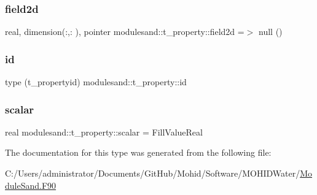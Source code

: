 \subsubsection{\texorpdfstring{field2d}{field2d}}
{\footnotesize\ttfamily real, dimension(\+:,\+:  ), pointer modulesand\+::t\+\_\+property\+::field2d =$>$ null ()\hspace{0.3cm}{\ttfamily [private]}}

\mbox{\label{structmodulesand_1_1t__property_a6497eb65f7326ef3fdb99c3c26823d44}} 
\subsubsection{\texorpdfstring{id}{id}}
{\footnotesize\ttfamily type (t\+\_\+propertyid) modulesand\+::t\+\_\+property\+::id\hspace{0.3cm}{\ttfamily [private]}}

\mbox{\label{structmodulesand_1_1t__property_a51b5d325598b9c09a38911eb1a29b339}} 
\subsubsection{\texorpdfstring{scalar}{scalar}}
{\footnotesize\ttfamily real modulesand\+::t\+\_\+property\+::scalar = Fill\+Value\+Real\hspace{0.3cm}{\ttfamily [private]}}



The documentation for this type was generated from the following file\+:\begin{DoxyCompactItemize}
\item 
C\+:/\+Users/administrator/\+Documents/\+Git\+Hub/\+Mohid/\+Software/\+M\+O\+H\+I\+D\+Water/\mbox{\hyperlink{_module_sand_8_f90}{Module\+Sand.\+F90}}\end{DoxyCompactItemize}
